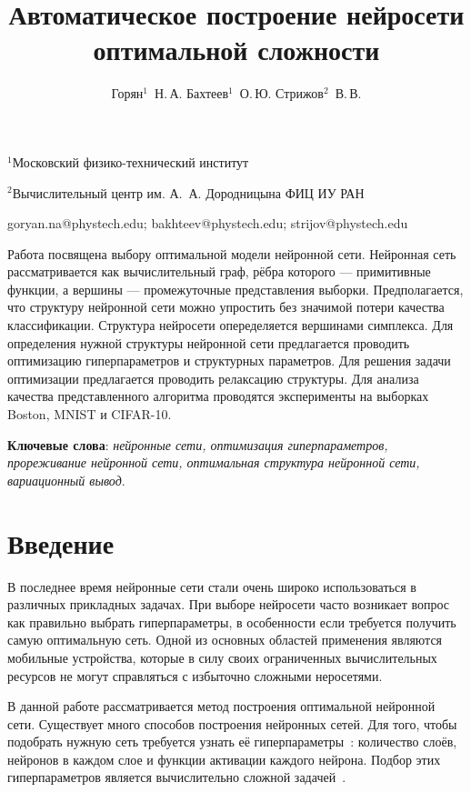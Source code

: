 \documentclass[12pt,twoside]{article}
\begin{document}
\title
    {Автоматическое построение нейросети оптимальной сложности}
\author
    {Горян$^1$~Н.\,А. Бахтеев$^1$~О.\,Ю.  Стрижов$^2$~В.\,В.} %

\organization
    {$^1$Московский физико-технический институт\par
    $^2$Вычислительный центр им. А.~А. Дородницына ФИЦ ИУ РАН}

\email
    {goryan.na@phystech.edu; bakhteev@phystech.edu; strijov@phystech.edu}    


    

\abstract
	{Работа посвящена выбору оптимальной модели нейронной сети. Нейронная сеть рассматривается как вычислительный граф, рёбра которого --- примитивные функции, а вершины --- промежуточные представления выборки. Предполагается, что структуру нейронной сети можно упростить без значимой потери качества классификации. Структура нейросети опеределяется вершинами симплекса. Для определения нужной структуры нейронной сети предлагается проводить оптимизацию гиперпараметров и структурных параметров. Для решения задачи оптимизации предлагается проводить релаксацию структуры. Для анализа качества представленного алгоритма проводятся эксперименты на выборках Boston, MNIST и CIFAR-10.
\bigskip

\textbf{Ключевые слова}: \emph {нейронные сети, оптимизация гиперпараметров, прореживание нейронной сети, оптимальная структура нейронной сети, вариационный вывод}.
}


\maketitle


\section{ Введение}
	
	В последнее время нейронные сети стали очень широко использоваться в различных прикладных задачах. При выборе нейросети часто возникает вопрос как правильно выбрать гиперпараметры, в особенности если требуется получить самую оптимальную  сеть. Одной из основных областей применения являются мобильные устройства, которые в силу своих ограниченных вычислительных ресурсов не могут справляться с избыточно сложными неросетями.
	
	В данной работе рассматривается метод построения оптимальной нейронной сети. Существует много способов построения нейронных сетей. Для того, чтобы подобрать нужную сеть требуется узнать её гиперпараметры~\cite{Myung1997}: количество слоёв, нейронов в каждом слое и функции активации каждого нейрона. Подбор этих гиперпараметров является вычислительно сложной задачей~\cite{sutskever2014}.
	
\end{document}
